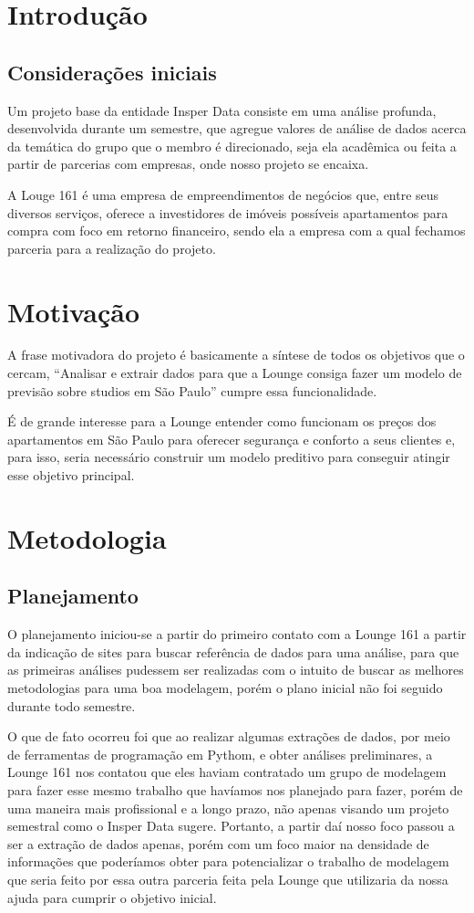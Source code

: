 \section*{Introdução}
\subsection*{Considerações iniciais}
Um projeto base da entidade Insper Data consiste em uma análise
profunda, desenvolvida durante um semestre, que agregue valores de análise 
de dados acerca da temática do grupo que o membro é direcionado, seja ela 
acadêmica ou feita a partir de parcerias com empresas, onde nosso projeto 
se encaixa.

A Louge 161 é uma empresa de empreendimentos 
de negócios que, entre seus diversos serviços, 
oferece a investidores de imóveis possíveis 
apartamentos para compra com foco em retorno 
financeiro, sendo ela a empresa com a qual 
fechamos parceria para a realização do projeto.

\section*{Motivação}
A frase motivadora do projeto é basicamente a síntese de todos os 
objetivos que o cercam, “Analisar e extrair dados para que a Lounge consiga 
fazer um modelo de previsão sobre studios em São Paulo” cumpre essa 
funcionalidade. 

É de grande interesse para a Lounge entender como funcionam os 
preços dos apartamentos em São Paulo para oferecer segurança e conforto a 
seus clientes e, para isso, seria necessário construir um modelo preditivo para 
conseguir atingir esse objetivo principal.

\section*{Metodologia}
\subsection*{Planejamento} 
O planejamento iniciou-se a partir do primeiro contato com a Lounge 
161 a partir da indicação de sites para buscar referência de dados para uma 
análise, para que as primeiras análises pudessem ser realizadas com o intuito 
de buscar as melhores metodologias para uma boa modelagem, porém o 
plano inicial não foi seguido durante todo semestre. 

O que de fato ocorreu foi que ao realizar algumas extrações de dados, 
por meio de ferramentas de programação em Pythom, e obter análises 
preliminares, a Lounge 161 nos contatou que eles haviam contratado um 
grupo de modelagem para fazer esse mesmo trabalho que havíamos nos 
planejado para fazer, porém de uma maneira mais profissional e a longo 
prazo, não apenas visando um projeto semestral como o Insper Data sugere.
Portanto, a partir daí nosso foco passou a ser a extração de dados 
apenas, porém com um foco maior na densidade de informações que 
poderíamos obter para potencializar o trabalho de 
modelagem que seria feito por essa outra parceria feita 
pela Lounge que utilizaria da nossa ajuda para cumprir o 
objetivo inicial.

